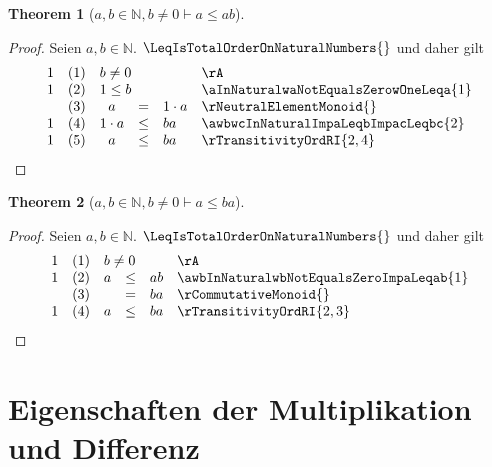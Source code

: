 \documentclass{book}
\theoremstyle{plain}
\newtheorem{theorem}{Theorem}
\theoremstyle{remark}
\theoremstyle{definition}
\begin{document}
\label{awbInNaturalwbNotEqualsZeroImpaLeqab}
\begin{theorem}[\(a,b\in\mathbb{N}, b\neq 0\vdash a\leq ab\)]
\end{theorem}
\begin{proof}
        Seien \(a,b\in\mathbb{N}\). \(\LeqIsTotalOrderOnNaturalNumbers{}\) und daher gilt
        \[
	\begin{array}{llclll}
        1   &  (1)  & \multicolumn{3}{l}{b\neq 0} & \rA \\
        1   &  (2)  & \multicolumn{3}{l}{1\leq b} & \aInNaturalwaNotEqualsZerowOneLeqa{1} \\
            &  (3)  & a&=&1\cdot a & \rNeutralElementMonoid{} \\
        1   &  (4)  & 1\cdot a&\leq & ba & \awbwcInNaturalImpaLeqbImpacLeqbc{2} \\
        1   &  (5)  & a&\leq & ba & \rTransitivityOrdRI{2,4} \\

	\end{array}
	\]
\end{proof}

\label{awbInNaturalwbNotEqualsZeroImpaLeqba}
\begin{theorem}[\(a,b\in\mathbb{N}, b\neq 0\vdash a\leq ba\)]
\end{theorem}
\begin{proof}
        Seien \(a,b\in\mathbb{N}\). \(\LeqIsTotalOrderOnNaturalNumbers{}\) und daher gilt
        \[
	\begin{array}{llclll}
        1   &  (1)  & \multicolumn{3}{l}{b\neq 0} & \rA \\
        1   &  (2)  & a&\leq &ab & \awbInNaturalwbNotEqualsZeroImpaLeqab{1} \\
            &  (3)  & &=& ba & \rCommutativeMonoid{} \\
        1   &  (4)  & a&\leq & ba & \rTransitivityOrdRI{2,3} \\

	\end{array}
	\]
\end{proof}


\section{Eigenschaften der Multiplikation und Differenz}
\end{document}
